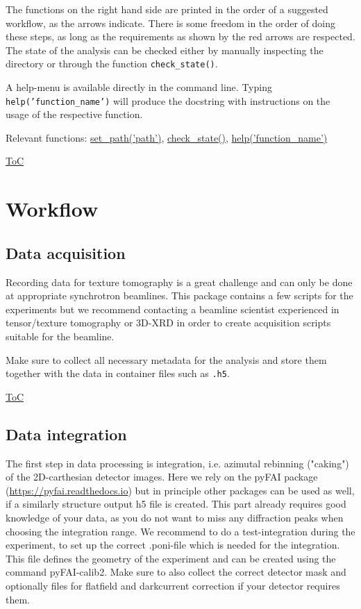 The functions on the right hand side are printed in the order of a suggested workflow, as the arrows indicate.
There is some freedom in the order of doing these steps, as long as the requirements as shown
by the red arrows are respected. The state of the analysis can be checked either by
manually inspecting the directory or through the function \texttt{check\_state()}.

A help-menu is available directly in the command line. Typing \texttt{help('function\_name')} will
produce the docstring with instructions on the usage of the respective function.

Relevant functions:
\hyperref[fun:setpath]{set\_path('path')},
\hyperref[fun:checkstate]{check\_state()},
\hyperref[fun:help]{help('function\_name')}

\begin{flushright}
    \hyperref[toc]{ToC}
\end{flushright}

\newpage
\section{Workflow}

\subsection{Data acquisition}
Recording data for texture tomography is a great challenge and can only be done at appropriate synchrotron beamlines.
This package contains a few scripts for the experiments but we recommend contacting 
a beamline scientist experienced in tensor/texture tomography or 
3D-XRD in order to create acquisition scripts suitable for the beamline.

Make sure to collect all necessary metadata for the analysis and store them together with the data in
container files such as \texttt{.h5}.

\begin{flushright}
    \hyperref[toc]{ToC}
\end{flushright}

\subsection{Data integration}\label{sec:integration}
The first step in data processing is integration, i.e. azimutal rebinning ("caking") of the 2D-carthesian detector images.
Here we rely on the pyFAI package (\url{https://pyfai.readthedocs.io}) but in principle other packages can be used as well,
if a similarly structure output h5 file is created.
This part already requires good knowledge of your data, as you do not want to miss any diffraction peaks when choosing the
integration range. We recommend to do a test-integration during the experiment, to set up the correct
.poni-file which is needed for the integration. This file defines the geometry of the experiment and can be
created using the command pyFAI-calib2. Make sure to also collect the correct detector mask and optionally files
for flatfield and darkcurrent correction if your detector requires them.

